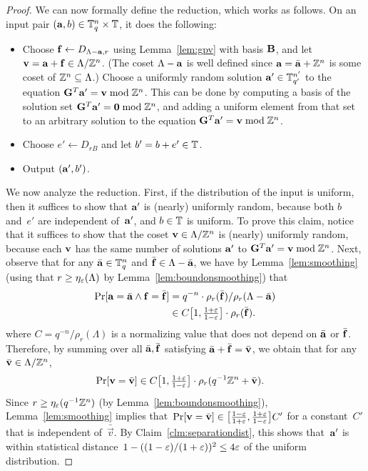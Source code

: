 \begin{proof}
  We can now formally define the reduction, which works as follows.
  On an input pair $(\veca, b) \in \T_{q}^{n} \times \T$, it does the
  following:
  \begin{itemize}
  \item Choose $\vecf \gets D_{\Lambda-\veca,r}$ using Lemma~\ref{lem:gpv} with basis
    $\matB$, and let $\vecv = \veca + \vecf \in
    \Lambda/\Z^{n}$. (The coset $\Lambda-\veca$ is well defined since $\veca =
      \bar{\veca}+\Z^{n}$ is some coset of $\Z^{n} \subseteq \Lambda$.) Choose a uniformly
    random solution $\veca' \in \T_{q'}^{n'}$ to the equation
    $\matG^{T} \veca' = \vecv \bmod \Z^{n}$. This can be done by computing a basis of the solution set $\matG^{T}
      \veca' = \veczero \bmod \Z^{n}$, and adding a uniform element from that set to an arbitrary solution to the equation
    $\matG^{T} \veca' = \vecv \bmod \Z^{n}$.
  \item Choose $e' \gets D_{rB}$ and let $b' = b + e' \in \T$.  
  \item Output $(\veca',b')$.
  \end{itemize}

  We now analyze the reduction.  First, if the distribution of the
  input is uniform, then it suffices to show that $\veca'$ is
  (nearly) uniformly random,
  because both $b$ and~$e'$ are independent of~$\veca'$, and $b \in
  \T$ is uniform.  To prove this claim, notice that it suffices to
  show that the coset $\vecv \in \Lambda/\Z^{n}$ is (nearly) uniformly
  random, because each $\vecv$ has the same number of solutions
  $\veca'$ to $\matG^{T} \veca' = \vecv \bmod \Z^{n}$.  Next, observe that for any $\bar{\veca} \in \T_q^n$ and $\bar{\vecf} \in \Lambda - \bar{\veca}$, we have by Lemma~\ref{lem:smoothing} 
	(using that $r \ge \smootheps(\Lambda)$ by Lemma~\ref{lem:boundonsmoothing}) that
	\begin{align}\label{eq:roundingonelatticeanother}
	  \Pr[\veca = \bar{\veca} \wedge \vecf = \bar{\vecf}] &= q^{-n} \cdot \rho_r(\bar{\vecf}) / \rho_r(\Lambda-\bar{\veca}) \nonumber \\
		& \in C \bracks[\big]{1,\tfrac{1+\epsilon}{1-\epsilon}}\cdot \rho_r(\bar \vecf).
	\end{align}
	where $C=q^{-n}/\rho_{r}(\Lambda)$ is a normalizing
  value that does not depend on $\bar{\veca}$ or $\bar{\vecf}$.
	Therefore, by summing over all $\bar \veca, \bar \vecf$ satisfying $\bar \veca + \bar \vecf = \bar \vecv$, we obtain that 
	for any $\bar{\vecv} \in \Lambda/\Z^{n}$,
  \begin{align*}
    \Pr[\vecv = \bar{\vecv}] 
    &\in C \bracks[\big]{1,\tfrac{1+\epsilon}{1-\epsilon}} \cdot
    \rho_{r}(q^{-1} \Z^{n} + \bar{\vecv}).
  \end{align*}
  Since $r
  \geq \smootheps(q^{-1} \Z^{n})$ (by
  Lemma~\ref{lem:boundonsmoothing}), Lemma~\ref{lem:smoothing} 
implies that~$\Pr[\vecv = \bar{\vecv}] \in \bracks[\big]{\tfrac{1-\epsilon}{1+\epsilon},\tfrac{1+\epsilon}{1-\epsilon}} C'$
for a constant~$C'$ that is independent of~$\bar{\vec{v}}$. By Claim~\ref{clm:separationdist}, this shows that~$\veca'$
is within statistical distance~$1-((1-\eps)/(1+\eps))^2 \le 4\epsilon$ of the uniform distribution.


\end{proof}
